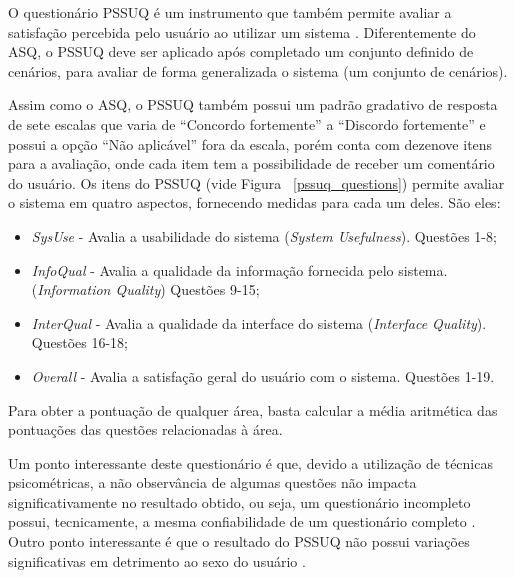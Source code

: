      O questionário PSSUQ é um instrumento que também permite avaliar a satisfação percebida pelo usuário ao utilizar um
      sistema \cite{lewis02}. Diferentemente do ASQ, o PSSUQ deve ser aplicado após completado um conjunto definido de cenários,
      para avaliar de forma generalizada o sistema (um conjunto de cenários).
      
      Assim como o ASQ, o PSSUQ também possui um padrão gradativo de resposta de sete escalas que varia de “Concordo fortemente”
      a “Discordo fortemente” e possui a opção “Não aplicável” fora da escala, porém conta com dezenove itens para a avaliação,
      onde cada item tem a possibilidade de receber um comentário do usuário. Os itens do PSSUQ (vide Figura ~\ref{pssuq_questions})
      permite avaliar o sistema em quatro aspectos, fornecendo medidas para cada um deles. São eles:
      
      \begin{itemize}
       \item \textit{SysUse} - Avalia a usabilidade do sistema (\textit{System Usefulness}).
	  \subitem Questões 1-8;
      
       \item \textit{InfoQual} - Avalia a qualidade da informação fornecida pelo sistema. (\textit{Information Quality})
	  \subitem Questões 9-15;
	  
       \item \textit{InterQual} - Avalia a qualidade da interface do sistema (\textit{Interface Quality}).
	  \subitem Questões 16-18;
       
       \item \textit{Overall} - Avalia a satisfação geral do usuário com o sistema.
	  \subitem Questões 1-19.

      \end{itemize}
      
      Para obter a pontuação de qualquer área, basta calcular a média aritmética das pontuações das questões relacionadas à área.
      
      
      Um ponto interessante deste questionário é que, devido a utilização de técnicas psicométricas, a não observância de
      algumas questões não impacta significativamente no resultado obtido, ou seja, um questionário incompleto possui, 
      tecnicamente, a mesma confiabilidade de um questionário completo \cite{lewis02}. Outro ponto interessante é que o
      resultado do PSSUQ não possui variações significativas em detrimento ao sexo do usuário \cite{lewis02}.
      
